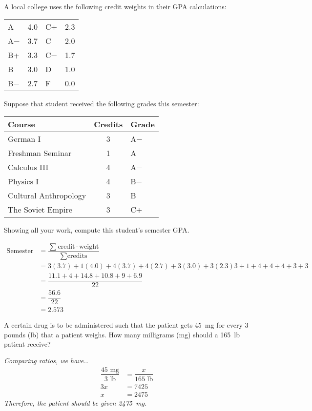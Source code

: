 \documentclass[12pt,letterpaper]{exam}
\begin{document}
\begin{questions}
\newpage
\question[10] A local college uses the following credit weights in their GPA calculations:
	\begin{table}[!ht]
	\centering
	\begin{tabular}{lr|lr}
	A & 4.0 & C+ & 2.3 \\
	A$-$ & 3.7 & C & 2.0 \\
	B+ & 3.3 & C$-$ & 1.7 \\
	B & 3.0 & D & 1.0 \\
	B$-$ & 2.7 & F & 0.0
	\end{tabular}
	\end{table} \par
Suppose that student received the following grades this semester:
	\begin{table}[!ht]
	\centering
	\begin{tabular}{lcl}
	Course & Credits & Grade \\ \hline
	German I & 3 & A$-$ \\
	Freshman Seminar & 1 & A \\
	Calculus III & 4 & A$-$ \\
	Physics I & 4 & B$-$ \\
	Cultural Anthropology & 3 & B \\
	The Soviet Empire & 3 & C+
	\end{tabular}
	\end{table} \par
Showing all your work, compute this student's semester GPA. \pspace

\sol 
	\[
	\begin{aligned}
	\text{Semester GPA}&= \dfrac{\sum \text{credit} \cdot \text{weight}}{\sum \text{credits}} \\[0.3cm]
	&= {3(3.7) + 1(4.0) + 4(3.7) + 4(2.7) + 3(3.0) + 3(2.3)}{3 + 1 + 4 + 4 + 4 + 3 + 3} \\[0.3cm]
	&= \dfrac{11.1 + 4 + 14.8 + 10.8 + 9 + 6.9}{22} \\[0.3cm]
	&= \dfrac{56.6}{22} \\[0.3cm]
	&= 2.573
	\end{aligned}
	\]



\newpage
\question[10] A certain drug is to be administered such that the patient gets 45~mg for every 3 pounds (lb) that a patient weighs. How many milligrams (mg) should a 165~lb patient receive? \pspace

{\itshape Comparing ratios, we have\dots \pspace
	\[
	\begin{aligned}
	\dfrac{45 \text{ mg}}{3 \text{ lb}}&= \dfrac{x}{165 \text{ lb}} \\[0.3cm]
	3x&= 7425 \\[0.3cm]
	x&= 2475
	\end{aligned}
	\] \pspace
Therefore, the patient should be given 2475~mg. 
}




\end{questions}
\end{document}
